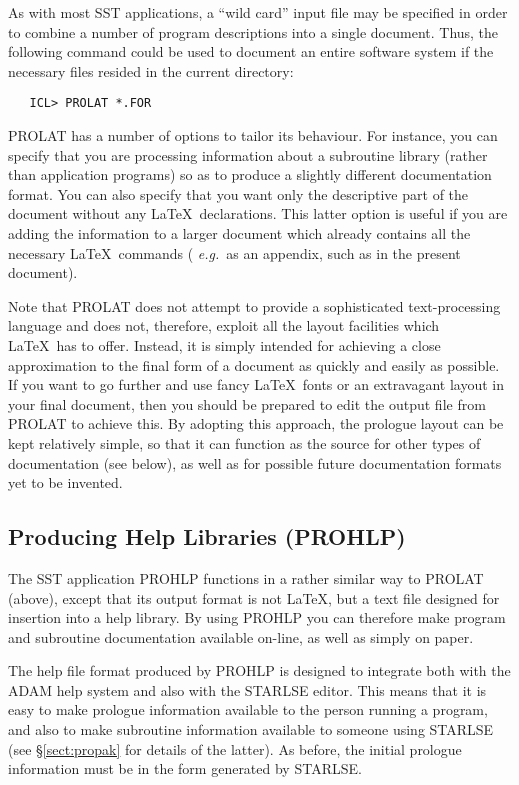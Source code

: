 \documentclass[twoside,11pt]{article}
\renewcommand{\_}{\texttt{\symbol{95}}}
\begin{document}
As with most SST applications, a ``wild card'' input file may be specified
in order to combine a number of program descriptions into a single document.
Thus, the following command could be used to document an entire software
system if the necessary files resided in the current directory:

\begin{verbatim}
   ICL> PROLAT *.FOR
\end{verbatim}

PROLAT has a number of options to tailor its behaviour.
For instance, you can specify that you are processing information about a
subroutine library (rather than application programs) so as to produce a
slightly different documentation format.
You can also specify that you want only the descriptive part of the document
without any \LaTeX\ declarations.
This latter option is useful if you are adding the information to a larger
document which already contains all the necessary \LaTeX\ commands ({\em
e.g.}\ as an appendix, such as in the present document).

Note that PROLAT does not attempt to provide a sophisticated text-processing
language and does not, therefore, exploit all the layout facilities which
\LaTeX\ has to offer.
Instead, it is simply intended for achieving a close approximation to the
final form of a document as quickly and easily as possible.
If you want to go further and use fancy \LaTeX\ fonts or an extravagant layout
in your final document, then you should be prepared to edit the output file
from PROLAT to achieve this.
By adopting this approach, the prologue layout can be kept relatively
simple, so that it can function as the source for other types of
documentation (see below), as well as for possible future documentation
formats yet to be invented.

\subsection{Producing Help Libraries (PROHLP)}

The SST application PROHLP functions in a rather similar way to PROLAT
(above), except that its output format is not \LaTeX, but a text file
designed for insertion into a help library.
By using PROHLP you can therefore make program and subroutine documentation
available on-line, as well as simply on paper.

The help file format produced by PROHLP is designed to integrate both with
the ADAM help system and also with the STARLSE editor.
This means that it is easy to make prologue information available to the
person running a program, and also to make subroutine information available
to someone using STARLSE (see \S\ref{sect:propak} for details of the
latter).
As before, the initial prologue information must be in the form generated by
STARLSE.
\end{document}
